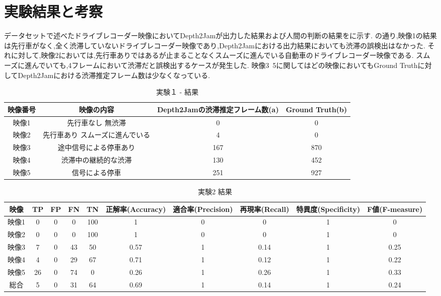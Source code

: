 \chapter{実験結果と考察}
データセットで述べたドライブレコーダー映像においてDepth2Jamが出力した結果および人間の判断の結果をに示す.
の通り,映像1の結果は先行車がなく,全く渋滞していないドライブレコーダー映像であり,Depth2Jamにおける出力結果においても渋滞の誤検出はなかった.
それに対して,映像2においては,先行車ありではあるが止まることなくスムーズに進んでいる自動車のドライブレコーダー映像である.
スムーズに進んでいても,4フレームにおいて渋滞だと誤検出するケースが発生した.
映像3~5に関してはどの映像においてもGround Truthに対してDepth2Jamにおける渋滞推定フレーム数は少なくなっている.
\begin{table}[htbp]
  \centering
  \begin{scriptsize}
  \begin{tabular}{cccc}
  \toprule
映像番号 & 映像の内容 & Depth2Jamの渋滞推定フレーム数(a) & Ground Truth(b)\\
  \midrule
映像1 & 先行車なし 無渋滞 & 0 & 0 \\
映像2 & 先行車あり スムーズに進んでいる & 4 & 0 \\
映像3 & 途中信号による停車あり & 167 & 870\\
映像4 & 渋滞中の継続的な渋滞 & 130 & 452\\
映像5 & 信号による停車 & 251 & 927 \\
\bottomrule
\end{tabular}
\end{scriptsize}
  \caption{実験１ - 結果}
  \label{tab:exp3_fig}
\end{table}


\begin{table}[htbp]
  \centering
  \begin{scriptsize}
  \begin{tabular}{cccccccccc}
  \toprule
映像 & TP & FP & FN & TN & 正解率(Accuracy) & 適合率(Precision) & 再現率(Recall) & 特異度(Specificity) & F値(F-measure) \\
  \midrule
映像1 & 0 & 0 & 0 & 100 & 1 & 0 & 0 & 1 & 0 \\
映像2 & 0 & 0 & 0 & 100 & 1 & 0 & 0 & 1 & 0 \\
映像3 & 7 & 0 & 43 & 50 & 0.57 & 1 & 0.14 & 1 & 0.25 \\
映像4 & 4 & 0 & 29 & 67 & 0.71 & 1 & 0.12 & 1 & 0.22 \\
映像5 & 26 & 0 & 74 & 0 & 0.26 & 1 & 0.26 & 1 & 0.33 \\
総合 & 5 & 0 & 31 & 64 & 0.69 & 1 & 0.14 & 1 & 0.24 \\
\bottomrule
\end{tabular}
\end{scriptsize}
  \caption{実験2 結果}
  \label{tab:mAP_fig}
\end{table}


